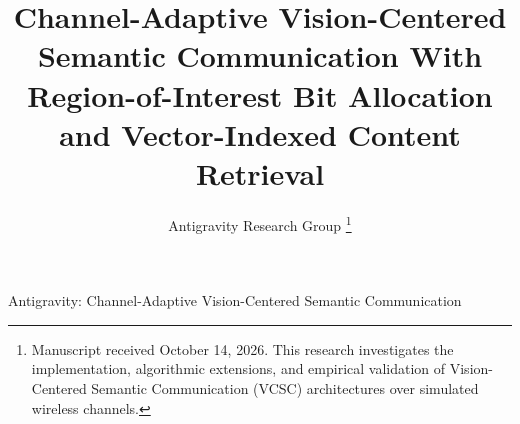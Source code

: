 \documentclass[journal,twocolumn]{IEEEtran}
\begin{document}
\title{Channel-Adaptive Vision-Centered Semantic Communication With Region-of-Interest Bit Allocation and Vector-Indexed Content Retrieval}

\author{Antigravity Research Group
\thanks{Manuscript received October 14, 2026. This research investigates the implementation, algorithmic extensions, and empirical validation of Vision-Centered Semantic Communication (VCSC) architectures over simulated wireless channels.}
}

%
{Antigravity: Channel-Adaptive Vision-Centered Semantic Communication}

\maketitle
\end{document}
